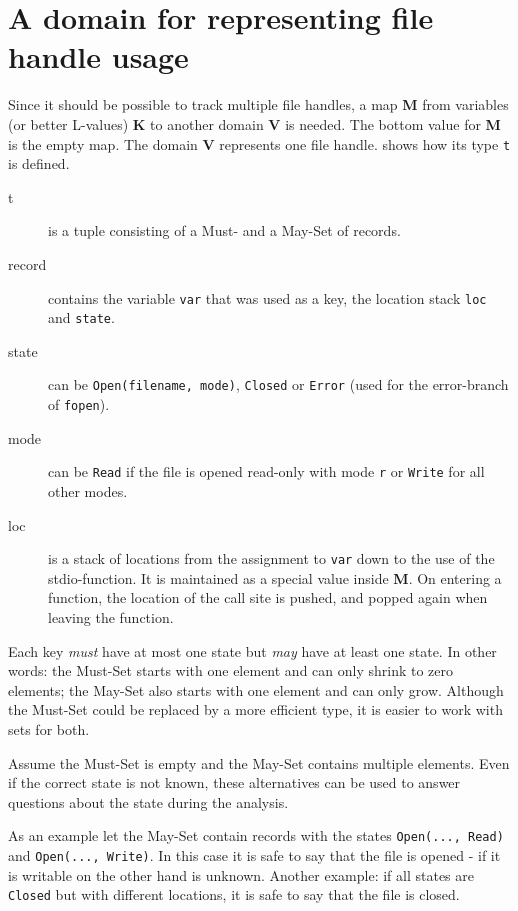 \section{A domain for representing file handle usage}
Since it should be possible to track multiple file handles, a map \textbf{M} from variables (or better L-values) \textbf{K} to another domain \textbf{V} is needed. The bottom value for \textbf{M} is the empty map.
The domain \textbf{V} represents one file handle.  shows how its type \verb|t| is defined.
\begin{description}
\item[t] is a tuple consisting of a Must- and a May-Set of records.

\item[record] contains the variable \verb|var| that was used as a key, the location stack \verb|loc| and \verb|state|.

\item[state] can be \verb|Open(filename, mode)|, \verb|Closed| or \verb|Error| (used for the error-branch of \verb|fopen|).

\item[mode] can be \verb|Read| if the file is opened read-only with mode \verb|r| or \verb|Write| for all other modes.

\item[loc] is a stack of locations from the assignment to \verb|var| down to the use of the stdio-function. It is maintained as a special value inside \textbf{M}. On entering a function, the location of the call site is pushed, and popped again when leaving the function.
\end{description}
Each key \textit{must} have at most one state but \textit{may} have at least one state.
In other words: the Must-Set starts with one element and can only shrink to zero elements; the May-Set also starts with one element and can only grow.
Although the Must-Set could be replaced by a more efficient type, it is easier to work with sets for both.

Assume the Must-Set is empty and the May-Set contains multiple elements. Even if the correct state is not known, these alternatives can be used to answer questions about the state during the analysis.

As an example let the May-Set contain records with the states \verb|Open(..., Read)| and \verb|Open(..., Write)|. In this case it is safe to say that the file is opened - if it is writable on the other hand is unknown. Another example: if all states are \verb|Closed| but with different locations, it is safe to say that the file is closed. %

